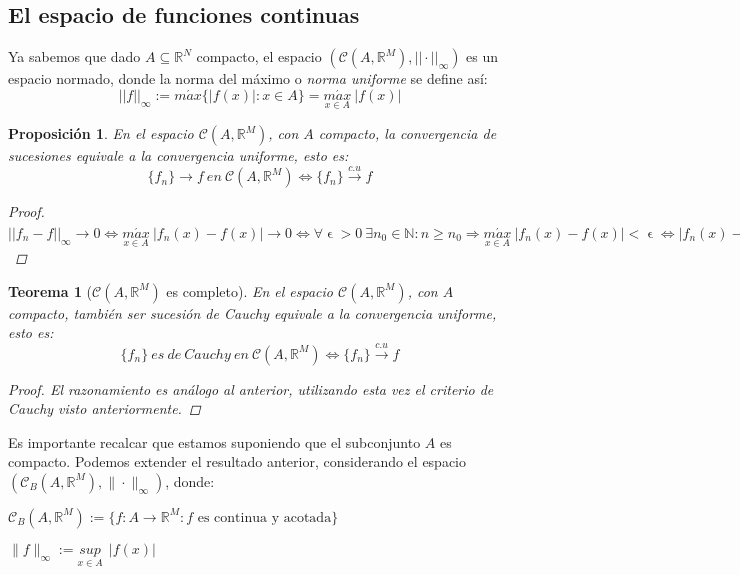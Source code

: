 \documentclass[11pt, a4paper]{article}
\let\epsilon\upvarepsilon
\newcommand{\R}{\mathbb{R}}
\newcommand{\fn}{\{f_n\}}
\theoremstyle{theorem-style}
\newtheorem{nth}{Teorema}[section]
\newtheorem*{nprop}{Proposición}
\theoremstyle{definition-style}
\theoremstyle{remark-style}
\theoremstyle{example-style}
\begin{document}
\subsection{El espacio de funciones continuas}

Ya sabemos que dado $A\subseteq \mathbb{R}^N$ compacto, el espacio $(\mathcal{C}(A,\mathbb{R}^M), ||\cdot||_{\infty})$ es un espacio normado, donde la norma del máximo o \textit{norma uniforme} se define así: $$||f||_{\infty} := m\acute{a}x \{ |f(x)|: x \in A\} = \underset{x\in A}{m\acute{a}x} \ |f(x)|$$

\begin{nprop} En el espacio $\mathcal{C}(A,\mathbb{R}^M)$, con $A$ compacto, la convergencia de sucesiones equivale a la convergencia uniforme, esto es: $$\fn \rightarrow f\ en\ \mathcal{C}(A,\mathbb{R}^M) \iff \fn \xrightarrow {c.u} f$$

\begin{proof} \hfill \\
$||f_n - f ||_{\infty} \rightarrow 0 \iff \underset{x \in A}{m\acute{a}x} \ |f_n(x) - f(x)| \rightarrow 0 \iff \forall \epsilon > 0\ \exists n_0 \in \mathbb{N}: n \ge n_0 \Rightarrow \underset{x \in A}{m\acute{a}x} \ |f_n(x) - f(x)| < \epsilon \iff |f_n(x) - f(x)| < \epsilon\  \forall x \in A \iff \fn \xrightarrow {c.u} f.$
\end{proof}
\end{nprop}

\begin{nth}[$\mathcal{C}(A,\R^M)$ es completo] En el espacio $\mathcal{C}(A,\mathbb{R}^M)$, con $A$ compacto, también ser sucesión de Cauchy equivale a la convergencia uniforme, esto es: $$\fn\ es\ de\ Cauchy\ en\ \mathcal{C}(A,\mathbb{R}^M) \iff \fn \xrightarrow {c.u} f $$

\begin{proof} El razonamiento es análogo al anterior, utilizando esta vez el criterio de Cauchy visto anteriormente.
\end{proof}
\end{nth}

Es importante recalcar que estamos suponiendo que el subconjunto $A$ es compacto. Podemos extender el resultado anterior, considerando el espacio $(\mathcal{C}_B(A,\mathbb{R}^M), \|\cdot\|_{\infty})$, donde: 

$\mathcal{C}_B(A,\mathbb{R}^M) := \{ f:A \longrightarrow \mathbb{R}^M: \text{$f$ es continua y acotada}\}$

$\|f\|_{\infty} := \underset{x \in A}{sup} \ \ |f(x)|$
\end{document}
